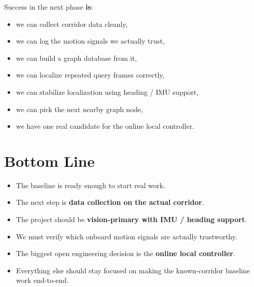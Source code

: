 \documentclass[11pt,a4paper]{article}
\begin{document}
Success in the next phase \textbf{is}:

\begin{itemize}[nosep]
  \item we can collect corridor data cleanly,
  \item we can log the motion signals we actually trust,
  \item we can build a graph database from it,
  \item we can localize repeated query frames correctly,
  \item we can stabilize localization using heading / IMU support,
  \item we can pick the next nearby graph node,
  \item we have one real candidate for the online local controller.
\end{itemize}


\section{Bottom Line}

\begin{mdframed}
\begin{itemize}[nosep]
  \item The baseline is ready enough to start real work.
  \item The next step is \textbf{data collection on the actual corridor}.
  \item The project should be \textbf{vision-primary with IMU / heading support}.
  \item We must verify which onboard motion signals are actually trustworthy.
  \item The biggest open engineering decision is the \textbf{online local controller}.
  \item Everything else should stay focused on making the known-corridor baseline work end-to-end.
\end{itemize}
\end{mdframed}
\end{document}
